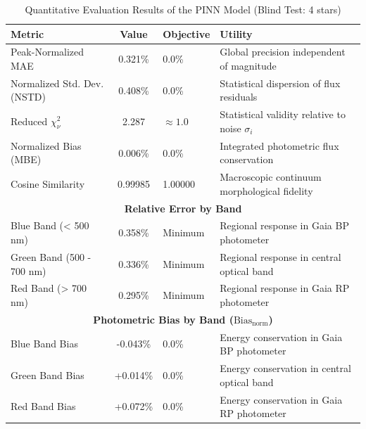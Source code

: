 
\begin{table}[htpb]
\centering
\caption{Quantitative Evaluation Results of the PINN Model (Blind Test: 4 stars)}
\label{tab:pinn_evaluation}
\begin{tabular}{lcll}
\hline
\textbf{Metric} & \textbf{Value} & \textbf{Objective} & \textbf{Utility} \\
\hline
Peak-Normalized MAE & 0.321\% & 0.0\% & Global precision independent of magnitude \\
Normalized Std. Dev. (NSTD) & 0.408\% & 0.0\% & Statistical dispersion of flux residuals \\
Reduced $\chi^2_\nu$ & 2.287 & $\approx 1.0$ & Statistical validity relative to noise $\sigma_i$ \\
Normalized Bias (MBE) & 0.006\% & 0.0\% & Integrated photometric flux conservation \\
Cosine Similarity & 0.99985 & 1.00000 & Macroscopic continuum morphological fidelity \\
\hline
\multicolumn{4}{c}{\textbf{Relative Error by Band}} \\
\hline
Blue Band (< 500 nm) & 0.358\% & Minimum & Regional response in Gaia BP photometer \\
Green Band (500 - 700 nm) & 0.336\% & Minimum & Regional response in central optical band \\
Red Band (> 700 nm) & 0.295\% & Minimum & Regional response in Gaia RP photometer \\
\hline
\multicolumn{4}{c}{\textbf{Photometric Bias by Band ($\text{Bias}_{\text{norm}}$)}} \\
\hline
Blue Band Bias & -0.043\% & 0.0\% & Energy conservation in Gaia BP photometer \\
Green Band Bias & +0.014\% & 0.0\% & Energy conservation in central optical band \\
Red Band Bias & +0.072\% & 0.0\% & Energy conservation in Gaia RP photometer \\
\hline
\end{tabular}
\end{table}
